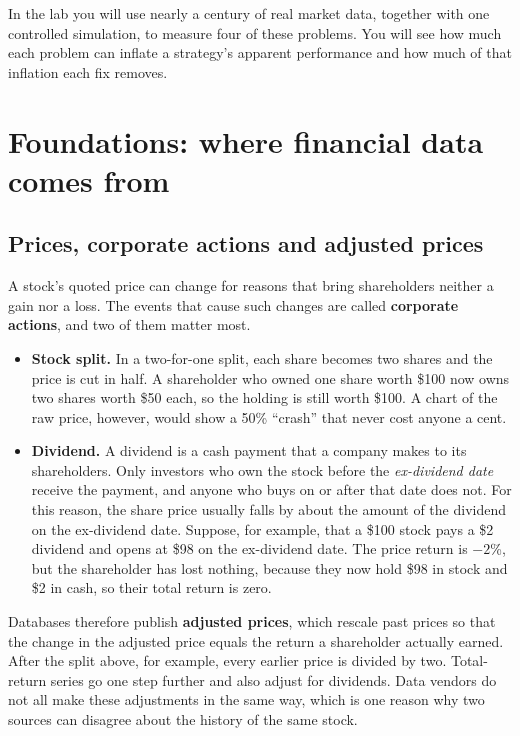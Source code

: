 In the lab you will use nearly a century of real market data, together with one controlled simulation, to measure four of these problems. You will see how much each problem can inflate a strategy's apparent performance and how much of that inflation each fix removes.


\section{Foundations: where financial data comes from}
\label{sec:02-foundations}

\subsection{Prices, corporate actions and adjusted prices}

A stock's quoted price can change for reasons that bring shareholders neither a gain nor a loss. The events that cause such changes are called \textbf{corporate actions}, and two of them matter most.

\begin{itemize}
  \item \textbf{Stock split.} In a two-for-one split, each share becomes two shares and the price is cut in half. A shareholder who owned one share worth \$100 now owns two shares worth \$50 each, so the holding is still worth \$100. A chart of the raw price, however, would show a 50\% ``crash'' that never cost anyone a cent.
  \item \textbf{Dividend.} A dividend is a cash payment that a company makes to its shareholders. Only investors who own the stock before the \emph{ex-dividend date} receive the payment, and anyone who buys on or after that date does not. For this reason, the share price usually falls by about the amount of the dividend on the ex-dividend date. Suppose, for example, that a \$100 stock pays a \$2 dividend and opens at \$98 on the ex-dividend date. The price return is $-2$\%, but the shareholder has lost nothing, because they now hold \$98 in stock and \$2 in cash, so their total return is zero.
\end{itemize}

Databases therefore publish \textbf{adjusted prices}, which rescale past prices so that the change in the adjusted price equals the return a shareholder actually earned. After the split above, for example, every earlier price is divided by two. Total-return series go one step further and also adjust for dividends. Data vendors do not all make these adjustments in the same way, which is one reason why two sources can disagree about the history of the same stock.

